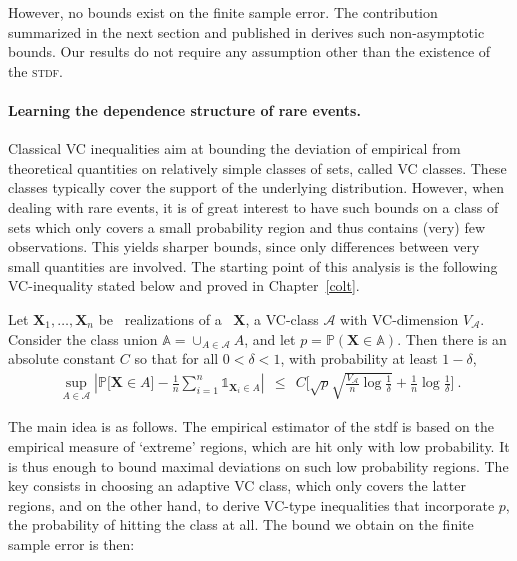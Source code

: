 However, no bounds exist on the finite sample error. The contribution summarized in the next section and published in \cite{COLT15} derives such non-asymptotic bounds. Our results do not require any assumption other than the existence of the \textsc{stdf}. 




\paragraph{Learning the dependence structure of rare events.}
Classical VC inequalities aim at bounding the deviation of empirical from theoretical quantities on relatively simple classes of sets, called VC classes. These classes typically cover the support of the underlying distribution.  However, when dealing with rare events, it is of great interest to have such bounds on a class of sets which only covers a small probability region and thus contains (very) few observations. This yields sharper bounds, since only differences  between very small quantities are involved. The starting point of this analysis is the following VC-inequality stated below and proved in Chapter~\ref{colt}.
\begin{theorem}
\label{thm-princ} 
Let $\mathbf{X}_1,\ldots,\mathbf{X}_n$ be \iid~realizations of a \rv~$\mathbf{X}$, a VC-class $\mathcal{A}$ with VC-dimension $V_{\mathcal{A}}$. %
Consider the class union $\mathbb{A} = \cup_{A \in \mathcal{A}} A$,
 and let  
$p = \mathbb{P}(\mathbf{X} \in \mathbb{A})$. Then there is an absolute constant $C$ so that for all $0<\delta<1$, with probability at least $1-\delta$,
\begin{align*}
\sup_{A \in \mathcal{A}} \left| \mathbb{P} \big[\mathbf{X} \in A\big] - \frac{1}{n} \sum_{i=1}^n \mathds{1}_{\mathbf{X}_i \in A}  \right| ~~\le~~ C \bigg[ \sqrt{p}\sqrt{\frac{V_{\mathcal{A}}}{n} \log{\frac{1}{\delta}}} + \frac{1}{n} \log{\frac{1}{\delta}} \bigg]~.
\end{align*}
\end{theorem}


The main idea is as follows. The empirical estimator of the {\sc stdf} is based on the empirical measure of `extreme' regions, which  are hit only with  low probability. It is thus enough to bound  maximal deviations on such low probability regions. 
 The key consists in choosing an adaptive VC class, which only covers the latter regions, and on the other hand, to derive VC-type inequalities that incorporate $p$, the probability of hitting the class at all. The bound we obtain on the finite sample error is then:

